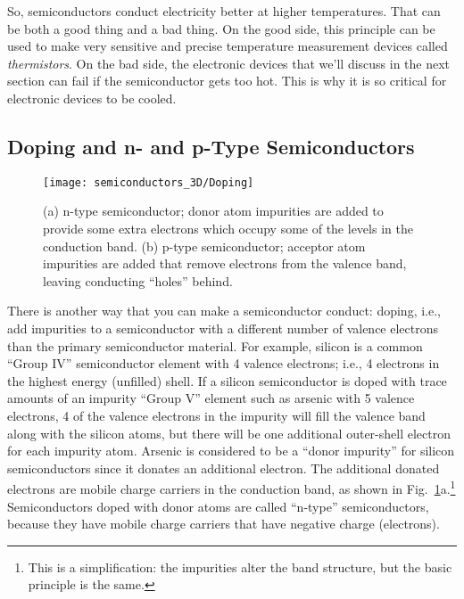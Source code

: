 So, semiconductors conduct electricity better at higher temperatures.
That can be both a good thing and a bad thing. On the good side, this 
principle can be used to make very sensitive and precise temperature 
measurement devices called {\it thermistors}.
On the bad side, the electronic devices that we'll discuss in the next
section can fail if the semiconductor gets too hot. This is why it
is so critical for electronic devices to be cooled.

\subsection{Doping and n- and p-Type Semiconductors}

\begin{figure}
\begin{center}
\texttt{[image: semiconductors\_3D/Doping]}
\end{center} 
\caption{(a) n-type semiconductor; donor atom impurities are added to provide 
some extra electrons which occupy some of the levels in the conduction band. 
(b) p-type semiconductor; acceptor atom impurities are added that remove
electrons from the valence band, leaving conducting ``holes'' behind. } 
\label{fig:Doping} 
\end{figure}



There is another way that you can make a semiconductor conduct: doping, 
i.e., add impurities to a semiconductor with a different number of valence
electrons than the primary semiconductor material. For example, silicon
is a common ``Group IV'' semiconductor element with 4 valence electrons; i.e., 
4 electrons in the highest energy (unfilled) shell. If a silicon semiconductor
is doped with trace amounts of  an impurity ``Group V'' element such as arsenic
with 5 valence electrons, 4 of the valence electrons in the impurity
will fill the valence band along with the silicon atoms, but there will be
one additional outer-shell electron for each impurity atom. Arsenic is
considered to be a ``donor impurity'' for silicon semiconductors since
it donates an additional electron. The additional donated electrons
are mobile charge carriers in the conduction band, as shown in 
Fig.~\ref{fig:Doping}a.\footnote{This is a simplification: the impurities
alter the band structure, but the basic principle is the same.}
Semiconductors doped with donor atoms are called ``n-type'' semiconductors,
because they have mobile charge carriers that have negative charge 
(electrons).

